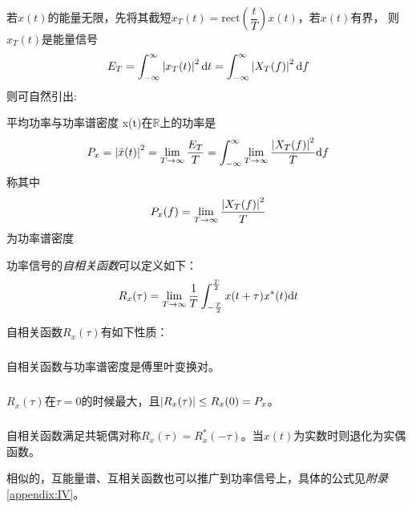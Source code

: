     若$x(t)$的能量无限，先将其截短$x_T(t)=\text{rect}(\dfrac{t}{T})x(t)$，若$x(t)$有界，
    则$x_T(t)$是能量信号
    \begin{equation}
        E_T=\int_{-\infty}^{\infty}\left\vert x_T(t) \right\vert^2\text{\upshape d} t=\int_{-\infty}^{\infty}\left\vert X_T(f) \right\vert^2\text{\upshape d} f
    \end{equation}
    则可自然引出:
    \begin{mydef}{平均功率与功率谱密度}
        x(t)在$\mathbb{R}$上的功率是
        \begin{equation}
            P_x=\left\vert \bar x(t) \right\vert^2=\lim_{T\to\infty}\frac{E_T}{T}=\int_{-\infty}^{\infty}\lim_{T\to\infty}\frac{\left\vert X_T(f) \right\vert^2}{T}\text{\upshape d} f
        \end{equation}
        称其中
        \begin{equation}
            P_x(f)=\lim_{T\to\infty}\frac{\left\vert X_T(f) \right\vert^2}{T}
        \end{equation}
        为功率谱密度
    \end{mydef}

    功率信号的\emph{自相关函数}可以定义如下：
    \begin{equation}
        R_x(\tau)=\lim_{T\to\infty}\frac{1}{T}\int_{-\frac{T}{2}}^{\frac{T}{2}}x(t+\tau)x^*(t)\text{\upshape d} t
    \end{equation}

    自相关函数$R_x(\tau)$有如下性质：
    \subparagraph{\hspace{-1em}}自相关函数与功率谱密度是傅里叶变换对。

    \subparagraph{\hspace{-1em}}$R_x(\tau)$在$\tau=0$的时候最大，且$\left\vert R_x(\tau) \right\vert\leq R_x(0)=P_x$。

    \subparagraph{\hspace{-1em}}自相关函数满足共轭偶对称$R_x(\tau)=R^*_x(-\tau)$。当$x(t)$为实数时则退化为实偶函数。

    相似的，互能量谱、互相关函数也可以推广到功率信号上，具体的公式见\emph{附录}\ref{appendix:IV}。

